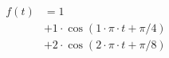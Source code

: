 \begin{center}
\begin{align*}
f(t) &= 1 \\
&+ 1 \cdot \cos( 1 \cdot \pi \cdot t + \pi/4) \\
&+ 2 \cdot \cos( 2 \cdot \pi \cdot t + \pi/8)
\end{align*}
\end{center}
